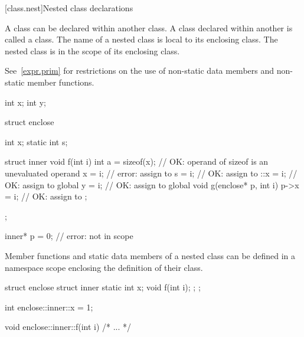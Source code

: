 [class.nest]{Nested class declarations}%
%
%

\pnum
A class can be declared within another class. A class declared within
another is called a  class. The name of a nested class
is local to its enclosing class.
%
The nested class is in the scope of its enclosing class.
\begin{note}
See~\ref{expr.prim} for restrictions on the use of non-static data
members and non-static member functions.
\end{note}

%
\begin{example}

\begin{codeblock}
int x;
int y;

struct enclose {
  int x;
  static int s;

  struct inner {
    void f(int i) {
      int a = sizeof(x);        // OK: operand of sizeof is an unevaluated operand
      x = i;                    // error: assign to 
      s = i;                    // OK: assign to 
      ::x = i;                  // OK: assign to global 
      y = i;                    // OK: assign to global 
    }
    void g(enclose* p, int i) {
      p->x = i;                 // OK: assign to 
    }
  };
};

inner* p = 0;                   // error:  not in scope
\end{codeblock}
\end{example}

\pnum
Member functions and static data members of a nested class can be
defined in a namespace scope enclosing the definition of their class.
%
\begin{example}

\begin{codeblock}
struct enclose {
  struct inner {
    static int x;
    void f(int i);
  };
};

int enclose::inner::x = 1;

void enclose::inner::f(int i) { /* ... */ }
\end{codeblock}
\end{example}

